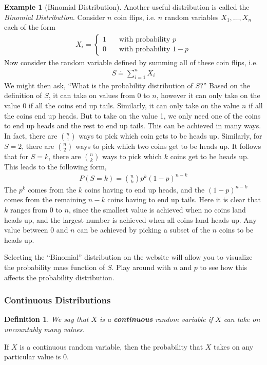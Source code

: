 \documentclass[11pt,letterpaper]{article}
\numberwithin{theorem}{section}
\newtheorem{definition}[theorem]{Definition}
\numberwithin{definition}{section}
\numberwithin{lemma}{section}
\numberwithin{corollary}{section}
\numberwithin{proposition}{section}
\theoremstyle{definition}
\numberwithin{remark}{section}
\numberwithin{claim}{section}
\numberwithin{observation}{section}
\numberwithin{fact}{section}
\numberwithin{assumption}{section}
\newtheorem{example}[theorem]{Example}
\numberwithin{example}{section}
\numberwithin{exercise}{section}
\begin{document}
\begin{example}[Binomial Distribution]
Another useful distribution is called the \textit{Binomial Distribution}. Consider $n$ coin flips, i.e. $n$ random variables $X_1,\dots,X_n$ each of the form
\begin{align*}
X_i = \begin{cases}
1 \hspace{1em} &\text{with probability }p\\
0 &\text{with probability }1-p
\end{cases}
\end{align*}
Now consider the random variable defined by summing all of these coin flips, i.e.
\begin{align*}
S \doteq \sum_{i=1}^n X_i
\end{align*}
We might then ask, ``What is the probability distribution of $S$?'' Based on the definition of $S$, it can take on values from $0$ to $n$, however it can only take on the value 0 if all the coins end up tails. Similarly, it can only take on the value $n$ if all the coins end up heads. But to take on the value 1, we only need one of the coins to end up heads and the rest to end up tails. This can be achieved in many ways. In fact, there are $\binom{n}{1}$ ways to pick which coin gets to be heads up. Similarly, for $S = 2$, there are $\binom{n}{2}$ ways to pick which two coins get to be heads up. It follows that for $S = k$, there are $\binom{n}{k}$ ways to pick which $k$ coins get to be heads up. This leads to the following form,
\begin{align*}
P(S = k) = \binom{n}{k}p^k(1-p)^{n-k}
\end{align*}
The $p^k$ comes from the $k$ coins having to end up heads, and the $(1-p)^{n-k}$ comes from the remaining $n-k$ coins having to end up tails. Here it is clear that $k$ ranges from $0$ to $n$, since the smallest value is achieved when no coins land heads up, and the largest number is achieved when all coins land heads up. Any value between $0$ and $n$ can be achieved by picking a subset of the $n$ coins to be heads up.

Selecting the ``Binomial'' distribution on the website will allow you to visualize the probability mass function of $S$. Play around with $n$ and $p$ to see how this affects the probability distribution.
\end{example}

\subsubsection{Continuous Distributions}
\begin{definition}
We say that $X$ is a \textbf{continuous} random variable if $X$ can take on uncountably many values. 
\end{definition}
If $X$ is a continuous random variable, then the probability that $X$ takes on any particular value is 0. 
\end{document}
